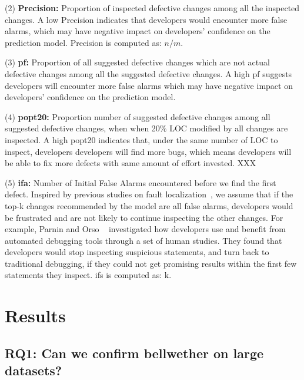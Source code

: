 \documentclass[sigconf]{acmart}
\theoremstyle{break}
\begin{document}
(2) \textbf{Precision:} Proportion of inspected defective changes among all the inspected changes. A low Precision indicates that developers would encounter more false alarms, which may have negative impact on developers' confidence on the prediction model. Precision is computed as: $n/m$.

(3) \textbf{pf:} Proportion of all suggested defective changes which are not actual defective changes among all the suggested defective changes. A high pf suggests developers will encounter more false alarms which may have negative impact on developers' confidence on the prediction model.

(4) \textbf{popt20:} Proportion number of suggested defective changes among all suggested defective changes, when when 20\% LOC modified by all changes are inspected. A high popt20 indicates that, under the same number of LOC to inspect, developers developers will find more bugs, which means developers will be able to fix more defects with same amount of effort invested. XXX

(5) \textbf{ifa:} Number of Initial False Alarms encountered before we find the first defect. Inspired by previous studies on fault localization~\cite{parnin2011automated,kochhar2016practitioners,xia2016automated}, we assume that if the top-k changes recommended by the model are all false alarms, developers would be frustrated and are not likely to continue inspecting the other changes. For example, Parnin and Orso ~\cite{parnin2011automated} investigated how developers use and benefit from automated debugging tools through a set of human studies. They found that developers would stop inspecting suspicious statements, and turn back to traditional debugging, if they could not get promising results within the first few statements they inspect. ifs is computed as: k.


\section{Results}
\label{sec:results}

\subsection{RQ1: Can we confirm bellwether on large datasets?}
\label{sec:rq1}
\end{document}
